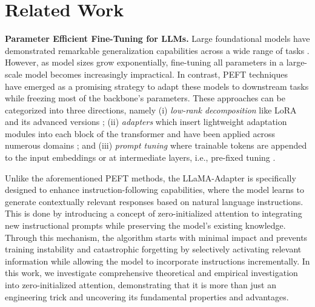 \section{Related Work}
\label{section:related_work}

\textbf{Parameter Efficient Fine-Tuning for LLMs.} Large foundational models have demonstrated remarkable generalization capabilities across a wide range of tasks \cite{devlin2018bert, brown2020language, touvron2023llama1, touvron2023llama2}. 
However, as model sizes grow exponentially, fine-tuning all parameters in a large-scale model becomes increasingly impractical. In contrast, PEFT techniques~\cite{hu2021lora,karimi2021compacter,gao2024clip,houlsby2019parameter,li2024graphadapter,li2021prefix,zhou2022learning,mangrulkar2022peft} have emerged as a promising strategy to adapt these models to downstream tasks while freezing most of the backbone’s parameters. These approaches can be categorized into three directions, namely (i) \textit{low-rank decomposition} like LoRA \cite{hu2021lora} and its advanced versions \cite{karimi2021compacter,zhang2023adalora}; (ii) \textit{adapters} which insert
lightweight adaptation modules into each block of the transformer and have been applied across
numerous domains \cite{gao2024clip,houlsby2019parameter,li2024graphadapter}; and (iii) \textit{prompt tuning} where trainable tokens are appended to the input embeddings \cite{lester2021power,zhou2022learning} or at intermediate layers, i.e., pre-fixed tuning \cite{liu2021p,li2021prefix,shi2023dept}. 

Unlike the aforementioned PEFT methods, the LLaMA-Adapter \cite{zhang2024llama} is specifically designed to enhance instruction-following capabilities, where the model learns to generate contextually relevant responses based on natural language instructions. This is done by introducing a concept of zero-initialized attention to integrating new instructional prompts while preserving the model’s existing knowledge.  Through this mechanism, the algorithm starts with minimal impact and prevents training instability and catastrophic forgetting by selectively activating relevant information while allowing the model to incorporate instructions incrementally. In this work, we investigate comprehensive theoretical and empirical investigation into zero-initialized attention, demonstrating that it is more than just an engineering trick and uncovering its fundamental properties and advantages.
 

